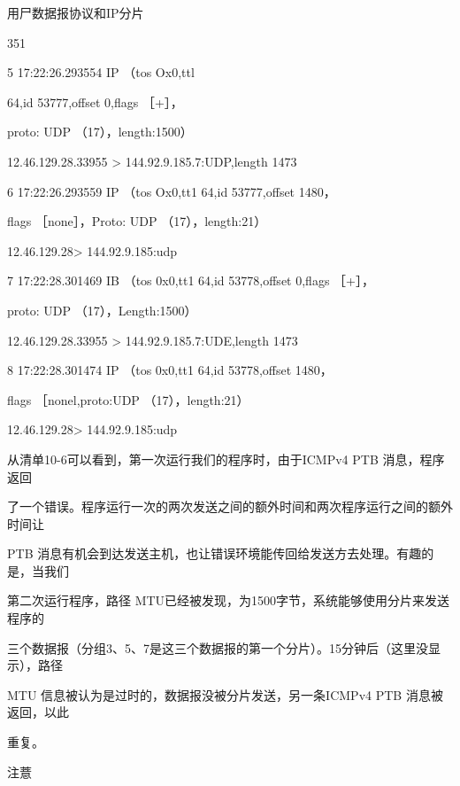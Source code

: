 用尸数据报协议和IP分片

351

5 17:22:26.293554 IP （tos Ox0,ttl

64,id 53777,offset 0,flags ［+］，

proto: UDP （17），length:1500）

12.46.129.28.33955 > 144.92.9.185.7:UDP,length 1473

6 17:22:26.293559 IP （tos Ox0,tt1 64,id 53777,offset 1480，

flags ［none］，Proto: UDP （17），length:21）

12.46.129.28> 144.92.9.185:udp

7 17:22:28.301469 IB （tos 0x0,tt1 64,id 53778,offset 0,flags ［+］，

proto: UDP （17），Length:1500）

12.46.129.28.33955 > 144.92.9.185.7:UDE,length 1473

8 17:22:28.301474 IP （tos 0x0,tt1 64,id 53778,offset 1480，

flags ［nonel,proto:UDP （17），length:21）

12.46.129.28> 144.92.9.185:udp

从清单10-6可以看到，第一次运行我们的程序时，由于ICMPv4 PTB 消息，程序返回

了一个错误。程序运行一次的两次发送之间的额外时间和两次程序运行之间的额外时间让

PTB 消息有机会到达发送主机，也让错误环境能传回给发送方去处理。有趣的是，当我们

第二次运行程序，路径 MTU已经被发现，为1500字节，系统能够使用分片来发送程序的

三个数据报（分组3、5、7是这三个数据报的第一个分片）。15分钟后（这里没显示），路径

MTU 信息被认为是过时的，数据报没被分片发送，另一条ICMPv4 PTB 消息被返回，以此

重复。

注薏

\iffalse
\begin{tcolorbox}
［RFC1191］推荐一个由PMTUD得到的PMTU 值在10分钟后过时。路
径MTU 发现有时会因为防火墙和网关过滤可能不加选择地丢弃ICMP 流量而
出现问题，这会损害 PMTU 发现算法。因为这点，从基于系统范畴或有更好保
证来看，可能要关闭PMTU发现。在Linux 中，文件/proc/sys/net/ipv4/ip\_no\_
Pmtu\_disc 可以置成1以关闭PMTU发现。在 Windows 中，可以编辑注册表入口
\verb|HKEY_LOCAL_MACHINE\System CurrentControl Set Services Topip Parameters
EnablePMTUDiscovery| 的值0。一个不使用ICMP 的、传统 PMTUD 的替代品已
经被开发出来［RFC4821］，我们将在第15 章介绍它。
\end{tcolorbox}
\fi

